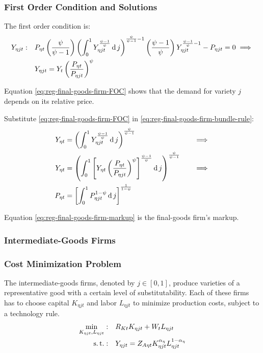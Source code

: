 \documentclass[
thesis.tex
]{subfiles}
\begin{document}
\subsubsection*{First Order Condition and Solutions}

The first order condition is:
\begin{align}
	Y_{\eta jt}:\quad & P_{\eta t} \left( \frac{\psi}{\psi-1} \right) \left( \int_{0}^{1} Y_{\eta jt}^{\frac{\psi-1}{\psi}} \operatorname{d} j \right)^{\frac{\psi}{\psi-1}-1} \left( \frac{\psi-1}{\psi} \right) Y_{\eta jt}^{\frac{\psi-1}{\psi}-1} - P_{\eta jt} = 0 \implies \nonumber \\
	\label{eq:reg-final-goods-firm-FOC}
	& Y_{\eta jt} = Y_t \left( \frac{P_{\eta t}}{P_{\eta jt}} \right)^{\psi}
\end{align}

Equation \ref{eq:reg-final-goods-firm-FOC} shows that the demand for variety $j$ depends on its relative price. 

Substitute \ref{eq:reg-final-goods-firm-FOC} in \ref{eq:reg-final-goods-firm-bundle-rule}:
\begin{alignat}{2}
	Y_{\eta t} & = \left( \int_{0}^{1} Y_{\eta jt}^{\frac{\psi-1}{\psi}} \operatorname{d} j \right)^{\frac{\psi}{\psi-1}} &\implies \nonumber \\
	Y_{\eta t} & = \left( \int_{0}^{1} \left[ Y_{\eta t} \left( \frac{P_{\eta t}}{P_{\eta jt}} \right)^{\psi} \right]^{\frac{\psi-1}{\psi}} \operatorname{d} j \right)^{\frac{\psi}{\psi-1}} \quad &\implies \nonumber \\
	P_{\eta t} & = \left[ \int_{0}^{1} P_{\eta jt}^{1-\psi} \operatorname{d} j \right]^{\frac{1}{1-\psi}} \label{eq:reg-final-goods-firm-markup}
\end{alignat}

Equation \ref{eq:reg-final-goods-firm-markup} is the final-goods firm's markup.


\subsubsection{Intermediate-Goods Firms}

\subsubsection*{Cost Minimization Problem}

The intermediate-goods firms, denoted by $j \in [0,1]$, produce varieties of a representative good with a certain level of substitutability. Each of these firms has to choose capital $K_{\eta jt}$ and labor $L_{\eta jt}$ to minimize production costs, subject to a technology rule.
\begin{align}
	\label{eq:reg-int-good-firm-total-cost}
	\min_{K_{\eta jt}, L_{\eta jt}}: \quad & R_{Kt} K_{\eta jt} + W_t L_{\eta jt} \\
	\label{eq:reg-int-good-firm-production-function}
	\operatorname{s.t.}: \quad & Y_{\eta jt} = Z_{A\eta t} K_{\eta jt}^{\alpha_\eta} L_{\eta jt}^{1-{\alpha_\eta}}
\end{align}
\end{document}
